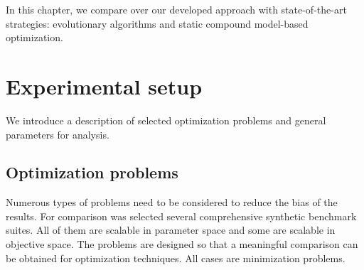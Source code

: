 In this chapter, we compare over our developed approach with state-of-the-art strategies: evolutionary algorithms and static compound model-based optimization.



\section{Experimental setup}
    We introduce a description of selected optimization problems and general parameters for analysis.

    \subsection{Optimization problems}
    Numerous types of problems need to be considered to reduce the bias of the results. For comparison was selected several comprehensive synthetic benchmark suites. All of them are scalable in parameter space and some are scalable in objective space. The problems are designed so that a meaningful comparison can be obtained for optimization techniques. All cases are minimization problems.

